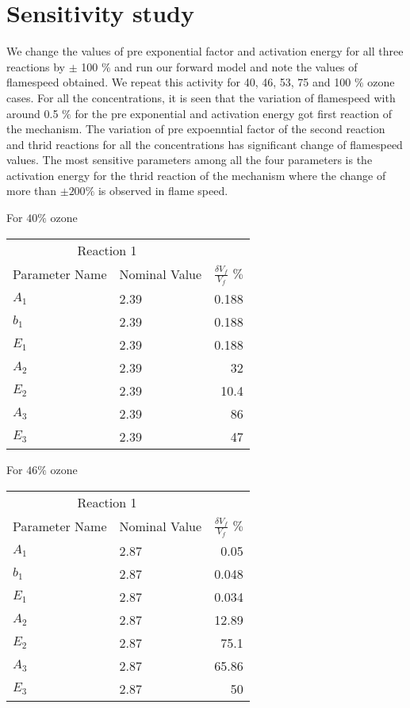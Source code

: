 \section{Sensitivity study}

  We
 change the values of pre exponential factor and activation energy for
 all three reactions by $\pm$ 100 $\% $ and run our forward model and
 note the values of flamespeed obtained. We repeat this activity for
 40, 46, 53, 75 and 100 $\%$ ozone cases. For all the concentrations,
 it is seen that the variation of flamespeed with around 0.5 $\%$ for
 the pre exponential and activation energy got first reaction of the
 mechanism. The variation of pre expoenntial factor of the second
 reaction and thrid reactions for all the concentrations has
 significant change of flamespeed values. The most sensitive
 parameters among all the four parameters is the activation energy for
 the thrid reaction of the mechanism where the change of more than
 $\pm 200\%$ is observed in flame speed.


 For $40\%$ ozone
 
   \begin{tabular}{llr}  
    \toprule
    \multicolumn{2}{c}{Reaction 1} \\
    \cmidrule(r){1-2}
    Parameter Name  & Nominal Value &  $\frac{\delta V_f}{V_f}$ $\%$\\
    \midrule
    $A_1$      &  2.39   &  0.188   \\
    $b_1$      &  2.39   &  0.188    \\
    $E_1$      &  2.39   &  0.188     \\
    $A_2$      &  2.39   &  32       \\       
    $E_2$      &  2.39   &   10.4    \\
    $A_3$      &  2.39   &   86    \\       
    $E_3$      &  2.39   &   47    \\
    
    \bottomrule
  \end{tabular}
  
  
  
 For $46\%$ ozone
 
   \begin{tabular}{llr}  
    \toprule
    \multicolumn{2}{c}{Reaction 1} \\
    \cmidrule(r){1-2}
    Parameter Name  & Nominal Value &  $\frac{\delta V_f}{V_f}$ $\%$\\
    \midrule
    $A_1$      &  2.87   &  0.05   \\
    $b_1$      &  2.87   &  0.048    \\
    $E_1$      &  2.87   &  0.034     \\
    $A_2$      &  2.87   &  12.89       \\       
    $E_2$      &  2.87   &   75.1    \\
    $A_3$      &  2.87   &   65.86   \\       
    $E_3$      &  2.87   &   50   \\
    
    \bottomrule
  \end{tabular}
  
